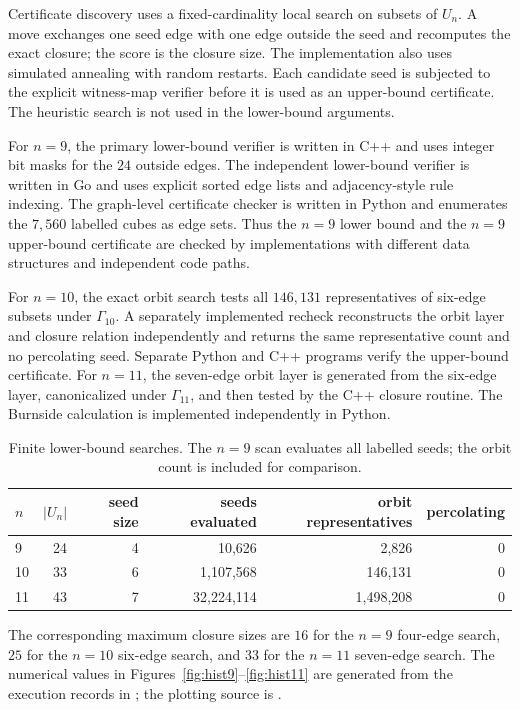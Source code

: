 \documentclass[11pt]{article}
\numberwithin{equation}{section}
\begin{document}
Certificate discovery uses a fixed-cardinality local search on subsets of $U_n$. A move exchanges one seed edge with one edge outside the seed and recomputes the exact closure; the score is the closure size. The implementation also uses simulated annealing with random restarts. Each candidate seed is subjected to the explicit witness-map verifier before it is used as an upper-bound certificate. The heuristic search is not used in the lower-bound arguments.

For $n=9$, the primary lower-bound verifier is written in C++ and uses integer bit masks for the $24$ outside edges. The independent lower-bound verifier is written in Go and uses explicit sorted edge lists and adjacency-style rule indexing. The graph-level certificate checker is written in Python and enumerates the $7,560$ labelled cubes as edge sets. Thus the $n=9$ lower bound and the $n=9$ upper-bound certificate are checked by implementations with different data structures and independent code paths.

For $n=10$, the exact orbit search tests all $146,131$ representatives of
six-edge subsets under $\Gamma_{10}$. A separately implemented recheck
reconstructs the orbit layer and closure relation independently and returns
the same representative count and no percolating seed. Separate Python and
C++ programs verify the upper-bound certificate. For $n=11$, the seven-edge orbit layer is generated from the six-edge layer, canonicalized under $\Gamma_{11}$, and then tested by the C++ closure routine. The Burnside calculation is implemented independently in Python.

\begin{table}[t]
\centering
\caption{Finite lower-bound searches. The $n=9$ scan evaluates all labelled
seeds; the orbit count is included for comparison.}
\label{tab:searches}
\begin{tabular}{lrrrrr}
\toprule
$n$ & $|U_n|$ & seed size & seeds evaluated & orbit representatives & percolating \\
\midrule
9  & 24 & 4 & 10,626 & 2,826 & 0 \\
10 & 33 & 6 & 1,107,568 & 146,131 & 0 \\
11 & 43 & 7 & 32,224,114 & 1,498,208 & 0 \\
\bottomrule
\end{tabular}
\end{table}

The corresponding maximum closure sizes are $16$ for the $n=9$ four-edge search, $25$ for the $n=10$ six-edge search, and $33$ for the $n=11$ seven-edge search. The numerical values in Figures~\ref{fig:hist9}--\ref{fig:hist11} are generated from the execution records in ; the plotting source is .
\end{document}
